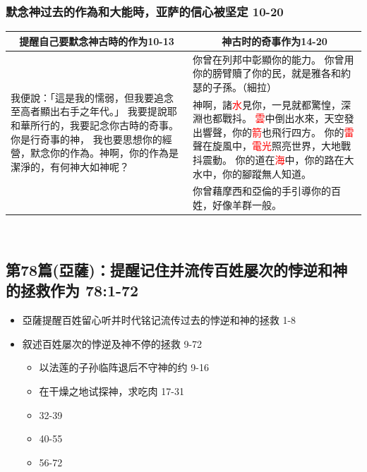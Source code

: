 \subsubsection{默念神过去的作為和大能時，亚萨的信心被坚定 10-20}
\begin{table}[H]
\centering
\begin{tabular}{p{6cm}|p{11.00cm}}\hline\hline
\multicolumn{1}{c|}{提醒自己要默念神古時的作为10-13}&\multicolumn{1}{c}{神古时的奇事作为14-20}\\\hline
\multirow{3}{6.1cm}{我便說：「這是我的懦弱，但我要追念至高者顯出右手之年代。」
我要提說耶和華所行的，我要記念你古時的奇事。你是行奇事的神，
我也要思想你的經營，默念你的作為。神啊，你的作為是潔淨的，有何神大如神呢？}
&你曾在列邦中彰顯你的能力。
你曾用你的膀臂贖了你的民，就是雅各和約瑟的子孫。（細拉）\\\cline{2-2}
&神啊，諸\textcolor{red}{水}見你，一見就都驚惶，深淵也都戰抖。
\textcolor{red}{雲}中倒出水來，天空發出響聲，你的\textcolor{red}{箭}也飛行四方。
你的\textcolor{red}{雷}聲在旋風中，\textcolor{red}{電光}照亮世界，大地戰抖震動。
你的道在\textcolor{red}{海}中，你的路在大水中，你的腳蹤無人知道。\\\cline{2-2}
&你曾藉摩西和亞倫的手引導你的百姓，好像羊群一般。\\\hline
\end{tabular}
\end{table} 


\subsection{第78篇(亞薩)：提醒记住并流传百姓屡次的悖逆和神的拯救作为  78:1-72}
\begin{itemize}
\itemsep-.45em  
\item 亞薩提醒百姓留心听并时代铭记流传过去的悖逆和神的拯救 1-8
\item 叙述百姓屡次的悖逆及神不停的拯救  9-72
\begin{itemize}
\itemsep-.45em  
\item 以法莲的子孙临阵退后不守神的约 9-16
\item 在干燥之地试探神，求吃肉 17-31
\item 32-39
\item 40-55
\item 56-72
\end{itemize}
\end{itemize}

